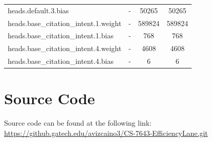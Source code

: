 \documentclass[10pt,twocolumn,letterpaper]{article}
\begin{document}
\begin{table}[htbp]
\begin{tabular}{|l|c|c|c|}
        heads.default.3.bias & - & 50265 & 50265 \\
        heads.base\_citation\_intent.1.weight & - & 589824 & 589824 \\
        heads.base\_citation\_intent.1.bias & - & 768 & 768 \\
        heads.base\_citation\_intent.4.weight & - & 4608 & 4608 \\
        heads.base\_citation\_intent.4.bias & - & 6 & 6 \\
        \hline
    \end{tabular}
    \label{table:model_layers_table}
\end{table}





\section{Source Code}
Source code can be found at the following link:
\href{https://github.gatech.edu/avizcaino3/CS-7643-EfficiencyLane.git}{https://github.gatech.edu/avizcaino3/CS-7643-EfficiencyLane.git}

{\small


}
\end{document}
